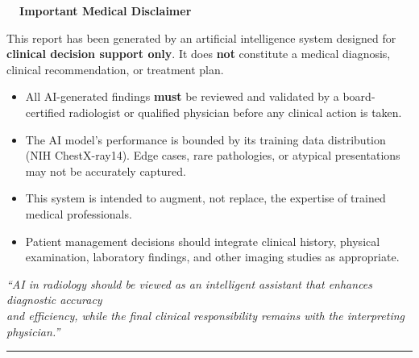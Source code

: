 \documentclass[11pt, a4paper]{article}
\begin{document}
\begin{disclaimerbox}
\begin{center}
\textbf{\color{riskModerate}\faExclamationTriangle\ \ Important Medical Disclaimer}
\end{center}

\vspace{0.3em}
\small
This report has been generated by an artificial intelligence system designed for \textbf{clinical decision
support only}. It does \textbf{not} constitute a medical diagnosis, clinical recommendation,
or treatment plan.

\vspace{0.3em}
\begin{itemize}[leftmargin=1.5em, itemsep=2pt]
  \item[\ding{110}] All AI-generated findings \textbf{must} be reviewed and validated by a board-certified radiologist
    or qualified physician before any clinical action is taken.
  \item[\ding{110}] The AI model's performance is bounded by its training data distribution (NIH ChestX-ray14).
    Edge cases, rare pathologies, or atypical presentations may not be accurately captured.
  \item[\ding{110}] This system is intended to augment, not replace, the expertise of trained medical professionals.
  \item[\ding{110}] Patient management decisions should integrate clinical history, physical examination,
    laboratory findings, and other imaging studies as appropriate.
\end{itemize}

\vspace{0.3em}
\begin{center}
\small\color{textSecondary}
\textit{``AI in radiology should be viewed as an intelligent assistant that enhances diagnostic accuracy}\\
\textit{and efficiency, while the final clinical responsibility remains with the interpreting physician.''}
\end{center}
\end{disclaimerbox}

\vspace{1em}

\begin{center}
\color{cardBorder}\rule{0.9\textwidth}{0.5pt}
\end{center}
\end{document}
